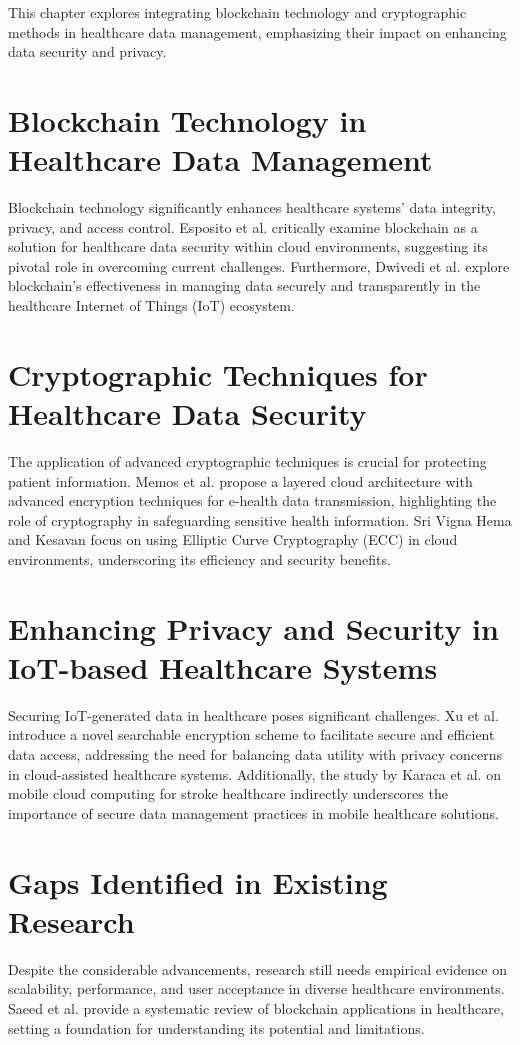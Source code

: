 \documentclass[cic,tc,english]{iiufrgs}
\begin{document}
This chapter explores integrating blockchain technology and cryptographic methods in healthcare data management, emphasizing their impact on enhancing data security and privacy.

\section{Blockchain Technology in Healthcare Data Management}
Blockchain technology significantly enhances healthcare systems' data integrity, privacy, and access control. Esposito et al. \cite{Esposito2018} critically examine blockchain as a solution for healthcare data security within cloud environments, suggesting its pivotal role in overcoming current challenges. Furthermore, Dwivedi et al. \cite{Dwivedi2019} explore blockchain's effectiveness in managing data securely and transparently in the healthcare Internet of Things (IoT) ecosystem.

\section{Cryptographic Techniques for Healthcare Data Security}
The application of advanced cryptographic techniques is crucial for protecting patient information. Memos et al. \cite{Memos2021} propose a layered cloud architecture with advanced encryption techniques for e-health data transmission, highlighting the role of cryptography in safeguarding sensitive health information. Sri Vigna Hema and Kesavan \cite{sri2019} focus on using Elliptic Curve Cryptography (ECC) in cloud environments, underscoring its efficiency and security benefits.

\section{Enhancing Privacy and Security in IoT-based Healthcare Systems}
Securing IoT-generated data in healthcare poses significant challenges. Xu et al. \cite{XuChang2019} introduce a novel searchable encryption scheme to facilitate secure and efficient data access, addressing the need for balancing data utility with privacy concerns in cloud-assisted healthcare systems. Additionally, the study by Karaca et al. \cite{Karaca2019} on mobile cloud computing for stroke healthcare indirectly underscores the importance of secure data management practices in mobile healthcare solutions.

\section{Gaps Identified in Existing Research}
Despite the considerable advancements, research still needs empirical evidence on scalability, performance, and user acceptance in diverse healthcare environments. Saeed et al. \cite{Saeed2022} provide a systematic review of blockchain applications in healthcare, setting a foundation for understanding its potential and limitations.
\end{document}
